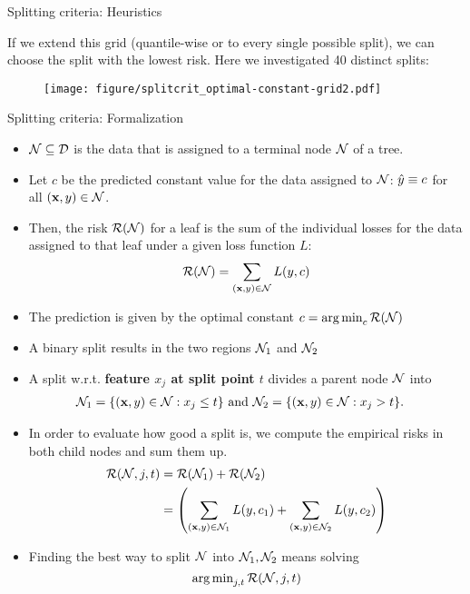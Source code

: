\documentclass[11pt,compress,t,notes=noshow, xcolor=table]{beamer}
\begin{document}
\begin{vbframe}{Splitting criteria: Heuristics}

If we extend this grid (quantile-wise or to every single possible split), we can choose the split with the lowest risk. 
Here we investigated 40 distinct splits:

\begin{figure}
\texttt{[image: figure/splitcrit\_optimal-constant-grid2.pdf]} 
\end{figure}


\end{vbframe}

\begin{vbframe}{Splitting criteria: Formalization}

\begin{itemize}
\item $\mathcal{N} \subseteq \mathcal{D}$ is the data that is assigned to a terminal node $\mathcal{N}$ of a tree.
\item Let $c$ be the predicted constant value for the data assigned to $\mathcal{N}$: $\hat{y} \equiv c$ for all $\left(\mathbf{x}, y\right) \in \mathcal{N}$.
\item Then, the risk $\mathcal{R}(\mathcal{N})$ for a leaf is the sum of the individual losses for the data assigned to that leaf under a given loss function $L$:
  $$\mathcal{R}(\mathcal{N}) = \sum\limits_{(\mathbf{x}, y) \in \mathcal{N}} L(y, c)$$
\item The prediction is given by the optimal constant $c = \operatorname{arg\,min}_c \mathcal{R}(\mathcal{N})$
\item A binary split results in the two regions $\mathcal{N}_1$ and $\mathcal{N}_2$
\end{itemize}

\framebreak

\begin{itemize}
\item A split w.r.t. \textbf{feature $x_j$ at split point $t$} divides a parent node $\mathcal{N}$ into 
  \begin{align*}
    \mathcal{N}_1 &= \{ (\mathbf{x}, y) \in \mathcal{N}: x_j \leq t \} \text{ and } \mathcal{N}_2 = \{ (\mathbf{x}, y) \in \mathcal{N}: x_j > t \}.
  \end{align*}
\item   
  In order to evaluate how good a split is, we compute the empirical risks
  in both child nodes and sum them up.
     \begin{align*}
      \mathcal{R}(\mathcal{N}, j, t) &=  \mathcal{R}(\mathcal{N}_1) +  \mathcal{R}(\mathcal{N}_2) \\
                  &= \left(\sum\limits_{(\mathbf{x},y) \in \mathcal{N}_1} L(y, c_1) + \sum\limits_{(\mathbf{x},y) \in \mathcal{N}_2} L(y, c_2)\right)
      \end{align*}
  \item Finding the best way to split $\mathcal{N}$ into $\mathcal{N}_1, \mathcal{N}_2$ means solving
  $$\operatorname{arg\,min}_{j, t} \mathcal{R}(\mathcal{N}, j, t)$$
\end{itemize}


\end{vbframe}
\end{document}
